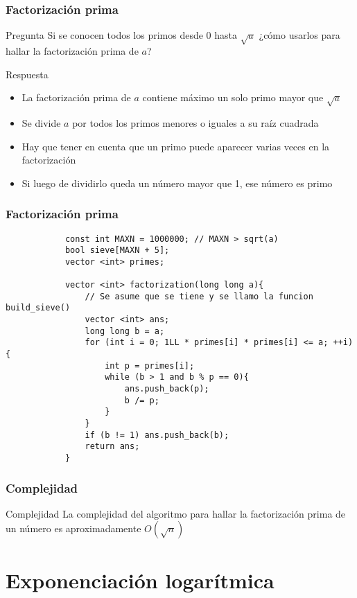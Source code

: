 \documentclass{beamer}
\begin{document}
	\begin{frame}
		\frametitle{Factorización prima}
		\begin{alertblock}{Pregunta}
			Si se conocen todos los primos desde 0 hasta $\sqrt{a}$ ¿cómo usarlos para hallar la factorización prima de $a$?
		\end{alertblock}
		\pause
		\begin{exampleblock}{Respuesta}
			\begin{itemize}
				\item La factorización prima de $a$ contiene máximo un solo primo mayor que $\sqrt{a}$
				\item Se divide $a$ por todos los primos menores o iguales a su raíz cuadrada
				\item Hay que tener en cuenta que un primo puede aparecer varias veces en la factorización
				\item Si luego de dividirlo queda un número mayor que 1, ese número es primo
			\end{itemize}
		\end{exampleblock}
	\end{frame}

	\begin{frame}[fragile]
		\frametitle{Factorización prima}
		\begin{lstlisting}
			const int MAXN = 1000000; // MAXN > sqrt(a)
			bool sieve[MAXN + 5];
			vector <int> primes;
		
			vector <int> factorization(long long a){
			    // Se asume que se tiene y se llamo la funcion build_sieve()
			    vector <int> ans;
			    long long b = a;
			    for (int i = 0; 1LL * primes[i] * primes[i] <= a; ++i){
			        int p = primes[i];
			        while (b > 1 and b % p == 0){
			            ans.push_back(p);
			            b /= p;
			        }
			    }
			    if (b != 1) ans.push_back(b);
			    return ans;
			}
		\end{lstlisting}
	\end{frame}
	
	\begin{frame}
		\frametitle{Complejidad}
		\begin{block}{Complejidad}
			La complejidad del algoritmo para hallar la factorización prima de un número es aproximadamente $O(\sqrt{n})$
		\end{block}
	\end{frame}


\section[Bigmod]{Exponenciación logarítmica}
\end{document}
